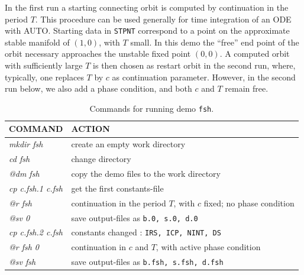 \documentclass[12pt]{report}
\begin{document}
In the first run a starting connecting orbit is computed 
by continuation in the period $T$.
This procedure can be used generally for time integration of an ODE with {\cal AUTO}.
Starting data in {\tt STPNT} correspond to a point on the approximate stable manifold
of $(1,0)$, with $T$ small.
In this demo the ``free'' end point of the orbit necessary approaches the
unstable fixed point $(0,0)$.
A computed orbit with sufficiently large $T$ is then chosen as restart orbit
in the second run, where, typically, one replaces $T$ by $c$ as continuation
parameter.
However, in the second run below, we also add a phase condition, 
and both $c$ and $T$ remain free.



\begin{table}[htbp]
\begin{center}
\begin{tabular}{| l | l |}
\hline
  COMMAND  & ACTION \\
\hline
  {\it mkdir fsh} & create an empty work directory \\ 
  {\it cd fsh} & change directory \\
  {\it @dm fsh} & copy the demo files to the work directory \\
\hline
  {\it cp c.fsh.1 c.fsh} & get the first constants-file \\ 
  {\it @r fsh} & continuation in the period $T$, with $c$ fixed; no phase condition \\ 
  {\it @sv 0} & save output-files as {\tt b.0, s.0, d.0} \\ 
\hline
  {\it cp c.fsh.2 c.fsh} & constants changed : {\tt IRS, ICP, NINT, DS} \\ 
  {\it @r fsh 0} & continuation in $c$ and $T$, with active phase condition \\ 
  {\it @sv fsh} & save output-files as {\tt b.fsh, s.fsh, d.fsh} \\ 
\hline
\end{tabular}
\caption{Commands for running demo {\tt fsh}.}
\label{tbl:demo_fsh}
\end{center}
\end{table}

\newpage
\end{document}
